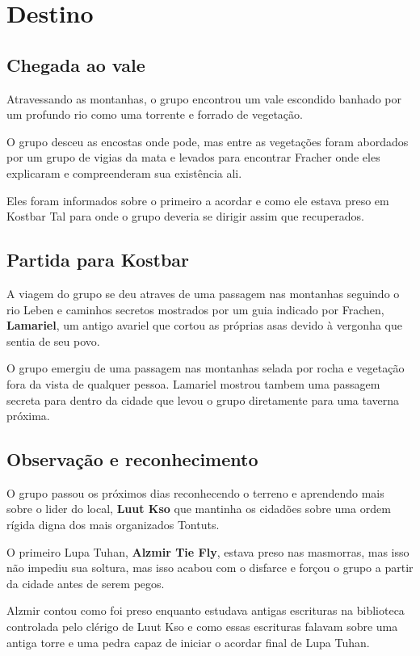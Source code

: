 \section{Destino}

\subsection{Chegada ao vale}

Atravessando as montanhas, o grupo encontrou um vale escondido
banhado por um profundo rio como uma torrente e forrado de
vegeta\c{c}\~ao.

O grupo desceu as encostas onde pode, mas entre as
vegeta\c{c}\~oes foram abordados por um grupo de vigias da mata
e levados para encontrar Fracher onde eles explicaram e
compreenderam sua exist\^encia ali.

Eles foram informados sobre o primeiro a acordar e como ele
estava preso em Kostbar Tal para onde o grupo deveria se dirigir
assim que recuperados.

\subsection{Partida para Kostbar}

A viagem do grupo se deu atraves de uma passagem nas montanhas
seguindo o rio Leben e caminhos secretos mostrados por um guia
indicado por Frachen, \textbf{Lamariel}, um antigo avariel que cortou as pr\'oprias
asas devido \`a vergonha que sentia de seu povo.

O grupo emergiu de uma passagem nas montanhas selada por rocha e
vegeta\c{c}\~ao fora da vista de qualquer pessoa.
Lamariel mostrou tambem uma passagem secreta para dentro da cidade
que levou o grupo diretamente para uma taverna pr\'oxima.

\subsection{Observa\c{c}\~ao e reconhecimento}
O grupo passou os pr\'oximos dias reconhecendo o terreno e aprendendo
mais sobre o lider do local, \textbf{Luut Kso} que mantinha os cidad\~oes
sobre uma ordem r\'igida digna dos mais organizados Tontuts.

O primeiro Lupa Tuhan, \textbf{Alzmir Tie Fly}, estava preso
nas masmorras, mas isso n\~ao
impediu sua soltura, mas isso acabou com o disfarce e for\c{c}ou
o grupo a partir da cidade antes de serem pegos.

Alzmir contou como foi preso enquanto estudava antigas escrituras
na biblioteca controlada pelo cl\'erigo de Luut Kso e como essas
escrituras falavam sobre uma antiga torre e uma pedra capaz
de iniciar o acordar final de Lupa Tuhan.
